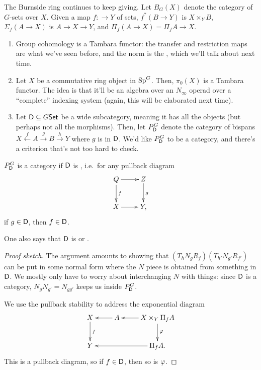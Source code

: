 \begin{exm}
The Burnside ring continues to keep giving. Let $B_G(X)$ denote the category of $G$-sets over $X$. Given a map
$f\colon \to Y$ of sets, $f^*(B\to Y)$ is $X\times_Y B$, $\Sigma_f(A\to X)$ is $A\to X\to Y$, and $\Pi_f(A\to X) =
\Pi_fA\to X$.
\end{exm}
\begin{exm}\hfill
\label{Evansexm}
\begin{enumerate}
	\item Group cohomology is a Tambara functor: the transfer and restriction maps are what we've seen before, and
	the norm is the , which we'll talk about next time.
	\item Let $X$ be a commutative ring object in $\mathrm{Sp}^G$. Then, $\pi_0(X)$ is a Tambara functor. The idea is that
	it'll be an algebra over an $N_\infty$ operad over a ``complete'' indexing system (again, this will be
	elaborated next time).
	\item Let $\mathsf D\subseteq G\mathsf{Set}$ be a wide subcategory, meaning it has all the objects (but perhaps not all the
	morphisms). Then, let $P_\mathsf D^G$ denote the category of bispans $X\stackrel f\gets A\stackrel g\to B\stackrel
	h\to Y$ where $g$ is in $\mathsf D$. We'd like $P_\mathsf D^G$ to be a category, and there's a criterion that's not too
	hard to check.\qedhere
\end{enumerate}
\end{exm}
\begin{prop}
$P_\mathsf D^G$ is a category if $\mathsf D$ is , i.e.\ for any pullback diagram
\[\xymatrix{
	Q\ar[r]\ar[d]^f & Z\ar[d]^g\\
	X\ar[r] & Y,
}\]
if $g\in\mathsf D$, then $f\in\mathsf D$.
\end{prop}
One also says that $\mathsf D$ is  or .
\begin{proof}[Proof sketch]
The argument amounts to showing that $(T_h N_g R_f)(T_{h'}N_{g'}R_{f'})$ can be put in some normal form where the
$N$ piece is obtained from something in $\mathsf D$. We mostly only have to worry about interchanging $N$ with things:
since $\mathsf D$ is a category, $N_gN_{g'} = N_{gg'}$ keeps us inside $P_\mathsf D^G$.

We use the pullback stability to address the exponential diagram
\[\xymatrix{
	X\ar[d]^f & A\ar[l] & X\times_Y\Pi_fA\ar[d]^\vp\ar[l]\\
	Y && \Pi_f A.\ar[ll]
}\]
This is a pullback diagram, so if $f\in\mathsf D$, then so is $\varphi$.
\end{proof}
